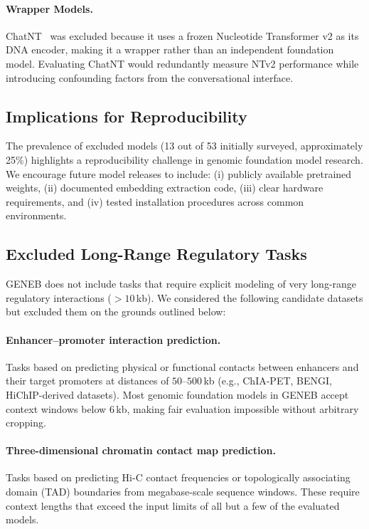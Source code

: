 \documentclass{article}
\theoremstyle{plain}
\theoremstyle{definition}
\theoremstyle{remark}
\begin{document}
\paragraph{Wrapper Models.}
ChatNT~\cite{chatnt} was excluded because it uses a frozen Nucleotide Transformer v2 as its DNA encoder, making it a wrapper rather than an independent foundation model. Evaluating ChatNT would redundantly measure NTv2 performance while introducing confounding factors from the conversational interface.

\subsection{Implications for Reproducibility}

The prevalence of excluded models (13 out of 53 initially surveyed, approximately 25\%) highlights a reproducibility challenge in genomic foundation model research. We encourage future model releases to include: (i) publicly available pretrained weights, (ii) documented embedding extraction code, (iii) clear hardware requirements, and (iv) tested installation procedures across common environments.

\subsection{Excluded Long-Range Regulatory Tasks}
\label{subsec:excluded_long_range_tasks}

GENEB does not include tasks that require explicit modeling of very
long-range regulatory interactions ($>10$\,kb). We considered the
following candidate datasets but excluded them on the grounds outlined
below:

\paragraph{Enhancer--promoter interaction prediction.} Tasks based on
predicting physical or functional contacts between enhancers and
their target promoters at distances of $50$--$500$\,kb (e.g.,
ChIA-PET, BENGI, HiChIP-derived datasets). Most genomic foundation
models in GENEB accept context windows below $6$\,kb, making fair
evaluation impossible without arbitrary cropping.

\paragraph{Three-dimensional chromatin contact map prediction.} Tasks
based on predicting Hi-C contact frequencies or topologically
associating domain (TAD) boundaries from megabase-scale sequence
windows. These require context lengths that exceed the input limits
of all but a few of the evaluated models.
\end{document}
